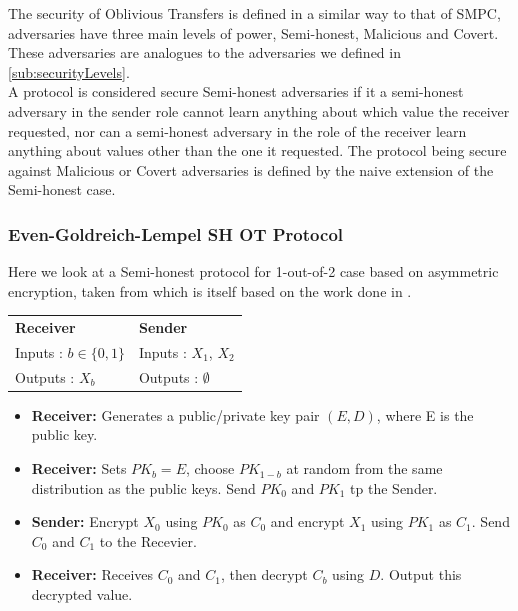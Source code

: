 \documentclass[a4paper,10pt]{article}
\begin{document}
      The security of Oblivious Transfers is defined in a similar way to that of SMPC, adversaries have three main levels of power, Semi-honest, Malicious and Covert. These adversaries are analogues to the adversaries we defined in \ref{sub:securityLevels}.\\

      A protocol is considered secure Semi-honest adversaries if it a semi-honest adversary in the sender role cannot learn anything about which value the receiver requested, nor can a semi-honest adversary in the role of the receiver learn anything about values other than the one it requested. The protocol being secure against Malicious or Covert adversaries is defined by the naive extension of the Semi-honest case.\\

    \subsubsection{Even-Goldreich-Lempel SH OT Protocol}
      Here we look at a Semi-honest protocol for 1-out-of-2 case based on asymmetric encryption, taken from \cite{PinkasSlides2014} which is itself based on the work done in \cite{EvenEtAl85}.\\

      \begin{tabular}[!htb]{p{6cm} p{6cm}}
	\textbf{Receiver} & \textbf{Sender}\\
	Inputs : $b \in \{0, 1\}$ & Inputs : $X_1$, $X_2$\\
	Outputs : $X_b$ & Outputs : $\emptyset$\\
      \end{tabular}

      \begin{itemize}
	\setlength{\itemsep}{0.5pt}
	\setlength{\parskip}{0pt}
	\setlength{\parsep}{0pt}

	\item \textbf{Receiver:} Generates a public/private key pair $(E, D)$, where E is the public key.\\
	\item \textbf{Receiver:} Sets $PK_b = E$, choose $PK_{1-b}$ at random from the same distribution as the public keys. Send $PK_0$ and $PK_1$ tp the Sender.\\
	\item \textbf{Sender:} Encrypt $X_0$ using $PK_0$ as $C_0$ and encrypt $X_1$ using $PK_1$ as $C_1$. Send $C_0$ and $C_1$ to the Recevier.\\
	\item \textbf{Receiver:} Receives $C_0$ and $C_1$, then decrypt $C_b$ using $D$. Output this decrypted value.
      \end{itemize}
\end{document}
